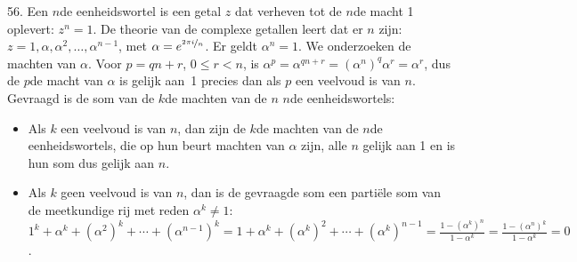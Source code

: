 \begin{problem}{56.}
    Een $n$de eenheidswortel is een getal $z$ dat verheven tot de $n$de macht 1 oplevert: $z^n = 1$. De theorie van de complexe getallen leert dat er $n$ zijn: $z = 1,\alpha,\alpha^2,\dotsc,\alpha^{n-1}$, met $\alpha = e^{\nicefrac{2 \pi i}{n}}$. Er geldt $\alpha^n = 1$. We onderzoeken de machten van $\alpha$. Voor $p = q n + r$, $0 \leq r < n$, is $\alpha^p = \alpha^{q n + r} = {(\alpha^n)}^q \alpha^r = \alpha^r$, dus de $p$de macht van $\alpha$ is gelijk aan~1 precies dan als $p$ een veelvoud is van $n$. Gevraagd is de som van de $k$de machten van de $n$ $n$de eenheidswortels:
    \begin{itemize}
        \item Als $k$ een veelvoud is van $n$, dan zijn de $k$de machten van de $n$de eenheidswortels, die op hun beurt machten van $\alpha$ zijn, alle $n$ gelijk aan 1 en is hun som dus gelijk aan $n$.
        \item Als $k$ geen veelvoud is van $n$, dan is de gevraagde som een partiële som van de meetkundige rij met reden $\alpha^k \neq 1$: $1^k + \alpha^k + {(\alpha^2)}^k + \dotsb + {(\alpha^{n-1})}^k = 1 + \alpha^k + {(\alpha^k)}^2 + \dotsb + {(\alpha^k)}^{n-1} = \frac{1 - {(\alpha^k)}^n}{1 - \alpha^k} = \frac{1 - {(\alpha^n)}^k}{1 - \alpha^k} = 0$.
    \end{itemize}
\end{problem}

\clearpage


